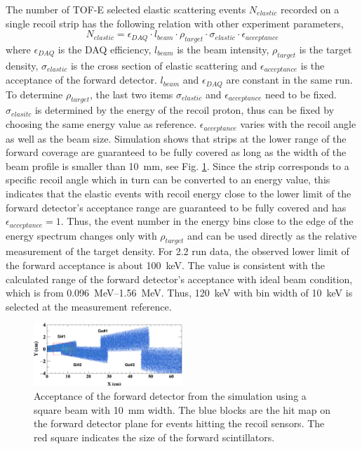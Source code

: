 \documentclass[fleqn,twocolumn,a4paper]{ikpar}
\begin{document}
The number of TOF-E selected elastic scattering events $N_{elastic}$ recorded on a single recoil strip has the
following relation with other experiment parameters,
\begin{equation}
  N_{elastic} = \epsilon_{DAQ}\cdot l_{beam}\cdot\rho_{target}\cdot\sigma_{elastic}\cdot\epsilon_{acceptance}
\end{equation}
where $\epsilon_{DAQ}$ is the DAQ efficiency, $l_{beam}$ is the beam intensity, $\rho_{target}$ is the target density,
$\sigma_{elastic}$ is the cross section of elastic scattering and
$\epsilon_{acceptance}$ is the acceptance of the forward detector.
$l_{beam}$ and $\epsilon_{DAQ}$ are constant in the same run.
To determine $\rho_{target}$, the last two items $\sigma_{elastic}$ and
$\epsilon_{acceptance}$ need to be fixed.
$\sigma_{elasitc}$ is determined by the energy of the recoil proton, thus can be
fixed by choosing the same energy value as reference.
$\epsilon_{acceptance}$ varies with the recoil angle as well as the beam size.
Simulation shows that strips at the lower range of the forward coverage are
guaranteed to be fully covered as long as the width of the beam profile is
smaller than \SI{10}{mm}, see Fig. \ref{fig:fwd_acceptance}.
Since the strip corresponds to a specific recoil angle which in turn
can be converted to an energy value, this indicates that the elastic events with recoil energy close to the lower
limit of the forward detector's acceptance range are guaranteed to be fully covered and has $\epsilon_{acceptance} = 1$.
Thus, the event number in the energy bins close to the edge of the energy
spectrum changes only with $\rho_{target}$ and can be used directly as the relative measurement of the target density.
For \SI{2.2}{\momentum} run data, the observed lower limit of the forward
acceptance is about \SI{100}{\keV}.
The value is consistent with the calculated range of the forward detector's
acceptance with ideal beam condition, which is from \SIrange{0.096}{1.56}{\MeV}.
Thus, \SI{120}{keV} with bin width of \SI{10}{\keV} is selected at the
measurement reference.
\begin{figure}[htb!]
  \centering
	\includegraphics[width=0.5\textwidth]{./fwd_acceptance.png}
  \caption{Acceptance of the forward detector from the simulation using a square
    beam with \SI{10}{\mm} width. The blue blocks are the hit map on the forward
    detector plane for events hitting the recoil sensors. The red square indicates
    the size of the forward scintillators.}
  \label{fig:fwd_acceptance}
\end{figure}
\end{document}
